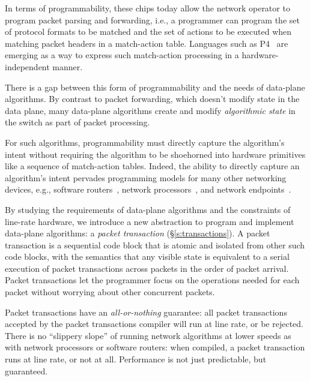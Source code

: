 In terms of programmability, these chips today allow the network operator to
program packet parsing and forwarding, i.e., a programmer can program the set
of protocol formats to be matched and the set of actions to be executed when
matching packet headers in a match-action table. Languages such as P4~\cite{p4}
are emerging as a way to express such match-action processing in a
hardware-independent manner.

There is a gap between this form of programmability and the needs of data-plane
algorithms. By contrast to packet forwarding, which doesn't modify state in the
data plane, many data-plane algorithms create and modify {\em algorithmic
state} in the switch as part of packet processing.

For such algorithms, programmability must directly capture the algorithm's
intent without requiring the algorithm to be shoehorned into hardware
primitives like a sequence of match-action tables. Indeed, the ability to
directly capture an algorithm's intent pervades programming models for many
other networking devices, e.g., software routers~\cite{click}, network
processors~\cite{packetc}, and network endpoints~\cite{qdisc}.

By studying the requirements of data-plane algorithms and the constraints of
line-rate hardware, we introduce a new abstraction to program and implement
data-plane algorithms: a {\em packet transaction} (\S\ref{s:transactions}). A
packet transaction is a sequential code block that is atomic and isolated from
other such code blocks, with the semantics that any visible state is equivalent to a serial
execution of packet transactions across packets in the order of packet
arrival.  Packet transactions let the programmer focus on the operations
needed for each packet without worrying about other concurrent packets.

Packet transactions have an \textit{all-or-nothing} guarantee: all packet
transactions accepted by the packet transactions compiler will run at line
rate, or be rejected.  There is no ``slippery slope'' of running network
algorithms at lower speeds as with network processors or software routers: when
compiled, a packet transaction runs at line rate, or not at all.  Performance
is not just predictable, but guaranteed.


